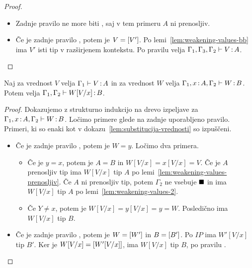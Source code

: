 \begin{proof}
\begin{itemize}
		\item Zadnje pravilo ne more biti , saj v tem primeru $A$ ni prenosljiv.
		
		\item Če je zadnje pravilo , potem je $V = [V']$.
		Po lemi~\ref{lem:weakening-values-bb} ima $V'$ isti tip v razširjenem kontekstu.
		Po pravilu  velja $\Gamma_1, \Gamma_3, \Gamma_2 \vdash V \mathinner{:} A$.
		
	\end{itemize}
\end{proof}

\begin{lema}\label{lem:substitucija-vrednosti-2}
	Naj za vrednost $V$ velja $\Gamma_1 \vdash V \mathinner{:} A$ in za vrednost $W$ velja $\Gamma_1, x \mathinner{:} A, \Gamma_2 \vdash W \mathinner{:} B$. Potem velja $\Gamma_1, \Gamma_2 \vdash W[V/x] \mathinner{:} B$.
\end{lema}

\begin{proof}
	Dokazujemo z strukturno indukcijo na drevo izpeljave za $\Gamma_1, x \mathinner{:} A, \Gamma_2 \vdash W \mathinner{:} B$.
	Ločimo primere glede na zadnje uporabljeno pravilo.
	Primeri, ki so enaki kot v dokazu~\ref{lem:substitucija-vrednosti} so izpuščeni.
	
	\begin{itemize}
		\item Če je zadnje pravilo , potem je $W = y$.
		Ločimo dva primera.
		\begin{itemize}
			\item Če je $y = x$, potem je $A = B$ in $W[V/x] = x[V/x] = V$. Če je $A$ prenosljiv tip ima $W[V/x]$ tip $A$ po lemi~\ref{lem:weakening-values-prenosljiv}. Če $A$ ni prenosljiv tip, potem $\Gamma_2$ ne vsebuje $\blacksquare$ in ima $W[V/x]$ tip $A$ po lemi~\ref{lem:weakening-values-2}.
			
			\item Če $Y \neq x$, potem je $W[V/x] = y[V/x] = y = W$. Posledično ima $W[V/x]$ tip $B$.
		\end{itemize}
		
		\item Če je zadnje pravilo , potem je $W=[W']$ in $B=[B']$. Po $IP$ ima $W'[V/x]$ tip $B'$. Ker je $W[V/x] = [W'[V/x]]$, ima $W[V/x]$ tip $B$, po pravilu .
		
	\end{itemize}
\end{proof}

